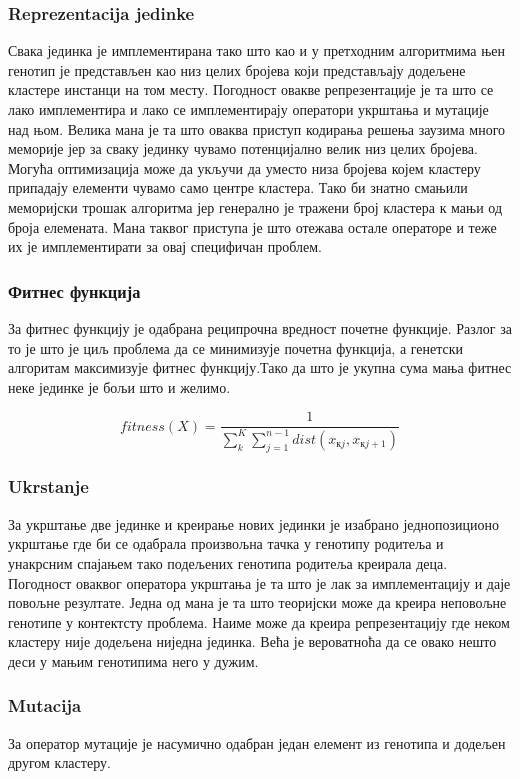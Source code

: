 \documentclass{article}
\begin{document}
 \subsubsection{Reprezentacija jedinke}
 Свака јединка је имплементирана тако што као и у претходним алгоритмима њен генотип је представљен као низ целих бројева који представљају додељене кластере инстанци на том месту.
 Погодност овакве репрезентације је та што се лако имплементира и лако се имплементирају оператори укрштања и мутације над њом.
 Велика мана је та што оваква приступ кодирања решења заузима много меморије јер за сваку јединку чувамо потенцијално велик низ целих бројева.
 Могућа оптимизација може да укључи да уместо низа бројева којем кластеру припадају елементи чувамо само центре кластера.
 Тако би знатно смањили меморијски трошак алгоритма јер генерално је тражени број кластера к мањи од броја елемената.
 Мана таквог приступа је што отежава остале операторе и теже их је имплементирати за овај специфичан проблем.
 
 \subsubsection{Фитнес функција}
 За фитнес функцију је одабрана реципрочна вредност почетне функције.
 Разлог за то је што је циљ проблема да се минимизује почетна функција, а генетски алгоритам максимизује фитнес функцију.Тако да што је укупна сума мања фитнес неке јединке је бољи што и желимо.
 
 \begin{displaymath}
fitness(X) = \frac{1}{\sum_{k}^{K}\sum_{j=1}^{n-1}dist(x_{кj},x_{кj+1})}
\end{displaymath}
 
 \subsubsection{Ukrstanje}
 За укрштање две јединке и креирање нових јединки је изабрано једнопозиционо укрштање где би се одабрала произвољна тачка у генотипу родитеља и унакрсним спајањем тако подељених генотипа родитеља креирала деца.
 Погодност оваквог оператора укрштања је та што је лак за имплементацију и даје повољне резултате.
 Једна од мана је та што теоријски може да креира неповољне генотипе у контектсту проблема.
 Наиме може да креира репрезентацију где неком кластеру није додељена ниједна јединка.
 Већа је вероватноћа да се овако нешто деси у мањим генотипима него у дужим.
 
 \subsubsection{Mutacija}
 За оператор мутације је насумично одабран један елемент из генотипа и додељен другом кластеру.
 
\end{document}
